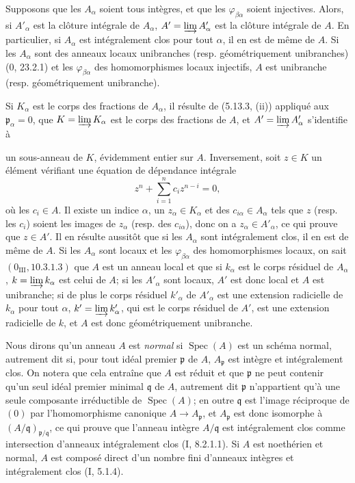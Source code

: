 \begin{corollary}[5.13.4]
\label{IV.2.s5.13.4-fr}
Supposons que les $A_\alpha$ soient tous intègres, et que les
$\varphi_{\beta\alpha}$ soient injectives. Alors, si $A'_\alpha$ est la clôture
intégrale de $A_\alpha$, $A'=\varinjlim A'_\alpha$ est la clôture intégrale de
$A$. En particulier, si $A_\alpha$ est intégralement clos pour tout $\alpha$,
il en est de même de $A$. Si les $A_\alpha$ sont des anneaux locaux unibranches
(resp. géométriquement unibranches) (0, 23.2.1) et les
$\varphi_{\beta\alpha}$ des homomorphismes locaux injectifs, $A$ est unibranche
(resp. géométriquement unibranche).
\end{corollary}

Si $K_\alpha$ est le corps des fractions de $A_\alpha$, il résulte de (5.13.3,
(ii)) appliqué aux $\mathfrak p_\alpha=0$, que
$K=\varinjlim K_\alpha$ est le corps des fractions de $A$, et
$A'=\varinjlim A'_\alpha$ s'identifie à


un sous-anneau de $K$, évidemment entier sur $A$. Inversement, soit $z\in K$
un élément vérifiant une équation de dépendance intégrale
\[
z^n+\sum_{i=1}^{n}c_i z^{n-i}=0,
\]
où les $c_i\in A$. Il existe un indice $\alpha$, un $z_\alpha\in K_\alpha$ et
des $c_{i\alpha}\in A_\alpha$ tels que $z$ (resp. les $c_i$) soient les images
de $z_\alpha$ (resp. des $c_{i\alpha}$), donc on a
$z_\alpha\in A'_\alpha$, ce qui prouve que $z\in A'$. Il en résulte aussitôt
que si les $A_\alpha$ sont intégralement clos, il en est de même de $A$. Si les
$A_\alpha$ sont locaux et les $\varphi_{\beta\alpha}$ des homomorphismes
locaux, on sait $(0_{\mathrm{III}}, 10.3.1.3)$ que $A$ est un anneau local et
que si $k_\alpha$ est le corps résiduel de $A_\alpha$,
$k=\varinjlim k_\alpha$ est celui de $A$; si les $A'_\alpha$ sont locaux, $A'$
est donc local et $A$ est unibranche; si de plus le corps résiduel
$k'_\alpha$ de $A'_\alpha$ est une extension radicielle de $k_\alpha$ pour
tout $\alpha$, $k'=\varinjlim k'_\alpha$, qui est le corps résiduel de $A'$,
est une extension radicielle de $k$, et $A$ est donc géométriquement
unibranche.

\begin{env}[5.13.5]
\label{IV.2.s5.13.5-fr}
Nous dirons qu'un anneau $A$ est \emph{normal} si
$\operatorname{Spec}(A)$ est un schéma normal, autrement dit si, pour tout
idéal premier $\mathfrak p$ de $A$, $A_{\mathfrak p}$ est intègre et
intégralement clos. On notera que cela entraîne que $A$ est réduit et que
$\mathfrak p$ ne peut contenir qu'un seul idéal premier minimal $\mathfrak q$
de $A$, autrement dit $\mathfrak p$ n'appartient qu'à une seule composante
irréductible de $\operatorname{Spec}(A)$; en outre $\mathfrak q$ est l'image
réciproque de $(0)$ par l'homomorphisme canonique
$A\to A_{\mathfrak p}$, et $A_{\mathfrak p}$ est donc isomorphe à
$(A/\mathfrak q)_{\mathfrak p/\mathfrak q}$, ce qui prouve que l'anneau
intègre $A/\mathfrak q$ est intégralement clos comme intersection d'anneaux
intégralement clos (I, 8.2.1.1). Si $A$ est noethérien et normal, $A$ est
composé direct d'un nombre fini d'anneaux intègres et intégralement clos (I,
5.1.4).
\end{env}

